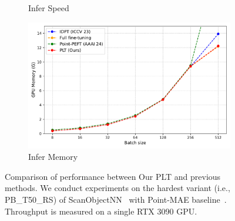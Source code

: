 \begin{figure}
\begin{subfigure}{0.46\textwidth}
        \caption{Infer Speed}
        \label{fig:per3}
    \end{subfigure}
    \hfill
    \begin{subfigure}{0.46\textwidth}
        \centering
        \includegraphics[width=\linewidth]{fig/supplement/performance/infer_memory.pdf}
        \caption{Infer Memory}
        \label{fig:per4}
    \end{subfigure}
    \hfill
    \caption{Comparison of performance between Our PLT and previous methods. We conduct experiments on the hardest variant (i.e., PB\_T50\_RS) of ScanObjectNN~\cite{uy2019revisiting} with Point-MAE baseline~\cite{pang2022masked}. Throughput is measured on a single RTX 3090 GPU.}
    \label{fig:performance}
\end{figure}